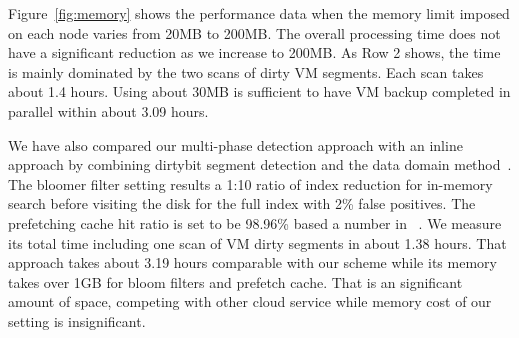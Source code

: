 Figure~\ref{fig:memory} shows the performance data when 
the memory limit imposed on each node varies  from 20MB to 200MB.
The overall processing time does not have a significant reduction as we increase to 200MB.
As Row 2 shows, the time is mainly dominated by  the two scans of dirty VM segments.
Each scan takes about 1.4 hours.
Using about 30MB is sufficient to have VM backup completed in parallel 
within about 3.09 hours.



We have also compared our multi-phase detection approach with an inline approach by combining
dirtybit segment  detection and  the data domain method~\cite{bottleneck08}. 
The bloomer filter setting  results a 1:10 ratio of index reduction for in-memory search before visiting
the disk for the full index with 2\% false positives. The prefetching cache hit ratio is set to be 98.96\% based
a number in ~\cite{bottleneck08}.
We measure its  total time including one scan of VM dirty segments in about 1.38 hours.
That approach takes about 3.19 hours comparable with our scheme while its memory takes
over 1GB for bloom filters and prefetch cache. That is an significant amount of space,
competing with other cloud service while memory cost of our setting is  insignificant.
 

